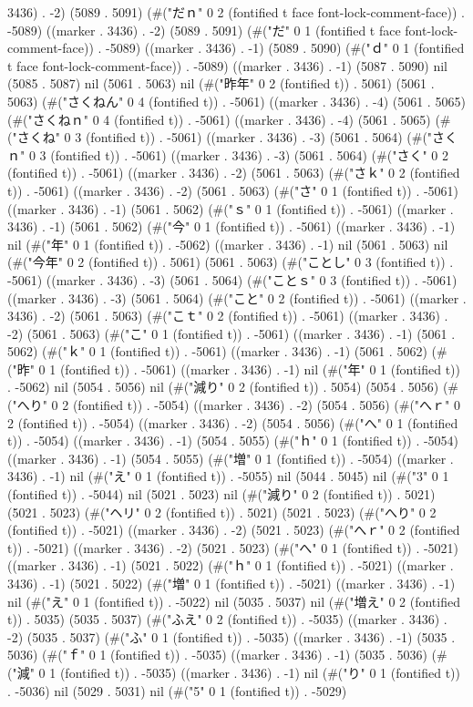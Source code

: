 3436) . -2) (5089 . 5091) (#("だｎ" 0 2 (fontified t face font-lock-comment-face)) . -5089) ((marker . 3436) . -2) (5089 . 5091) (#("だ" 0 1 (fontified t face font-lock-comment-face)) . -5089) ((marker . 3436) . -1) (5089 . 5090) (#("ｄ" 0 1 (fontified t face font-lock-comment-face)) . -5089) ((marker . 3436) . -1) (5087 . 5090) nil (5085 . 5087) nil (5061 . 5063) nil (#("昨年" 0 2 (fontified t)) . 5061) (5061 . 5063) (#("さくねん" 0 4 (fontified t)) . -5061) ((marker . 3436) . -4) (5061 . 5065) (#("さくねｎ" 0 4 (fontified t)) . -5061) ((marker . 3436) . -4) (5061 . 5065) (#("さくね" 0 3 (fontified t)) . -5061) ((marker . 3436) . -3) (5061 . 5064) (#("さくｎ" 0 3 (fontified t)) . -5061) ((marker . 3436) . -3) (5061 . 5064) (#("さく" 0 2 (fontified t)) . -5061) ((marker . 3436) . -2) (5061 . 5063) (#("さｋ" 0 2 (fontified t)) . -5061) ((marker . 3436) . -2) (5061 . 5063) (#("さ" 0 1 (fontified t)) . -5061) ((marker . 3436) . -1) (5061 . 5062) (#("ｓ" 0 1 (fontified t)) . -5061) ((marker . 3436) . -1) (5061 . 5062) (#("今" 0 1 (fontified t)) . -5061) ((marker . 3436) . -1) nil (#("年" 0 1 (fontified t)) . -5062) ((marker . 3436) . -1) nil (5061 . 5063) nil (#("今年" 0 2 (fontified t)) . 5061) (5061 . 5063) (#("ことし" 0 3 (fontified t)) . -5061) ((marker . 3436) . -3) (5061 . 5064) (#("ことｓ" 0 3 (fontified t)) . -5061) ((marker . 3436) . -3) (5061 . 5064) (#("こと" 0 2 (fontified t)) . -5061) ((marker . 3436) . -2) (5061 . 5063) (#("こｔ" 0 2 (fontified t)) . -5061) ((marker . 3436) . -2) (5061 . 5063) (#("こ" 0 1 (fontified t)) . -5061) ((marker . 3436) . -1) (5061 . 5062) (#("ｋ" 0 1 (fontified t)) . -5061) ((marker . 3436) . -1) (5061 . 5062) (#("昨" 0 1 (fontified t)) . -5061) ((marker . 3436) . -1) nil (#("年" 0 1 (fontified t)) . -5062) nil (5054 . 5056) nil (#("減り" 0 2 (fontified t)) . 5054) (5054 . 5056) (#("へり" 0 2 (fontified t)) . -5054) ((marker . 3436) . -2) (5054 . 5056) (#("へｒ" 0 2 (fontified t)) . -5054) ((marker . 3436) . -2) (5054 . 5056) (#("へ" 0 1 (fontified t)) . -5054) ((marker . 3436) . -1) (5054 . 5055) (#("ｈ" 0 1 (fontified t)) . -5054) ((marker . 3436) . -1) (5054 . 5055) (#("増" 0 1 (fontified t)) . -5054) ((marker . 3436) . -1) nil (#("え" 0 1 (fontified t)) . -5055) nil (5044 . 5045) nil (#("3" 0 1 (fontified t)) . -5044) nil (5021 . 5023) nil (#("減り" 0 2 (fontified t)) . 5021) (5021 . 5023) (#("ヘリ" 0 2 (fontified t)) . 5021) (5021 . 5023) (#("へり" 0 2 (fontified t)) . -5021) ((marker . 3436) . -2) (5021 . 5023) (#("へｒ" 0 2 (fontified t)) . -5021) ((marker . 3436) . -2) (5021 . 5023) (#("へ" 0 1 (fontified t)) . -5021) ((marker . 3436) . -1) (5021 . 5022) (#("ｈ" 0 1 (fontified t)) . -5021) ((marker . 3436) . -1) (5021 . 5022) (#("増" 0 1 (fontified t)) . -5021) ((marker . 3436) . -1) nil (#("え" 0 1 (fontified t)) . -5022) nil (5035 . 5037) nil (#("増え" 0 2 (fontified t)) . 5035) (5035 . 5037) (#("ふえ" 0 2 (fontified t)) . -5035) ((marker . 3436) . -2) (5035 . 5037) (#("ふ" 0 1 (fontified t)) . -5035) ((marker . 3436) . -1) (5035 . 5036) (#("ｆ" 0 1 (fontified t)) . -5035) ((marker . 3436) . -1) (5035 . 5036) (#("減" 0 1 (fontified t)) . -5035) ((marker . 3436) . -1) nil (#("り" 0 1 (fontified t)) . -5036) nil (5029 . 5031) nil (#("5" 0 1 (fontified t)) . -5029) 
